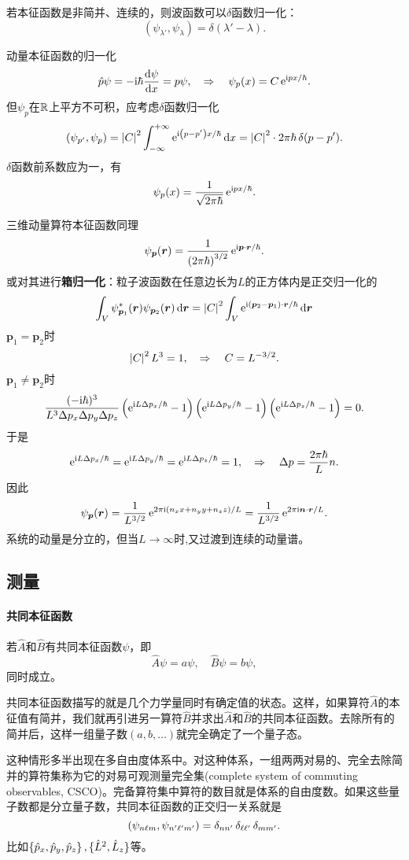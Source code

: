 若本征函数是非简并、连续的，则波函数可以$\delta$函数归一化：%
\[
	(\psi_{\lambda'},\psi_\lambda)=\delta(\lambda'-\lambda).
\]
\begin{example}{动量本征函数的归一化}{}
	\[
		\hat p\psi=-\mathrm{i}\hbar\frac{\mathrm{d}^{\;\!\!}\psi}{\mathrm{d} x^{\;\!\!}}=p\psi,\quad\Rightarrow\quad\psi_p(x)=C\mathop{}\!\mathrm{e}^{\mathrm{i} px/\hbar}.
	\]
	但$\psi_p$在$\mathbb R$上平方不可积，应考虑$\delta$函数归一化
	\[
		(\psi_{p'},\psi_p)=\left\lvert C\right\rvert^2\int_{-\infty}^{+\infty}\mathop{}\!\mathrm{e}^{\mathrm{i}\left(p-p'\right)x/\hbar}\mathop{}\!\mathrm{d} x=\left\lvert C\right\rvert^2\cdot 2\pi\hbar\mathop{}\!\delta(p-p').
	\]
	$\delta$函数前系数应为一，有
	\[
		\psi_p(x)=\frac1{\sqrt{2\pi\hbar}}\mathop{}\!\mathrm{e}^{\mathrm{i} px/\hbar}.
	\]
	
	三维动量算符本征函数同理
	\[
		\psi_{\bm p}(\bm r)=\frac1{\left(2\pi\hbar\right)^{3/2}}\mathop{}\!\mathrm{e}^{\mathrm{i}\bm p\cdot\bm r/\hbar}.
	\]
	\tcblower
	或对其进行\textbf{箱归一化}：粒子波函数在任意边长为$L$的正方体内是正交归一化的
	\[
		\int_V\psi_{\bm p_1}^\ast(\bm r)\psi_{\bm p_2}(\bm r)\mathop{}\!\mathrm{d}\bm r=\left\lvert C\right\rvert^2\int_V\mathop{}\!\mathrm{e}^{\mathrm{i}(\bm p_2-\bm p_1)\cdot\bm r/\hbar}\mathop{}\!\mathrm{d}\bm r
	\]
	$\bm p_1=\bm p_2$时
	\[
		\left\lvert C\right\rvert^2L^3=1,\quad\Rightarrow\quad C=L^{-3/2}.
	\]
	$\bm p_1\neq\bm p_2$时
	\[
		\frac{(-\mathrm{i}\hbar)^3}{L^3\Delta p_x\Delta p_y\Delta p_z}\left(\mathop{}\!\mathrm{e}^{\mathrm{i} L\Delta p_x/\hbar}-1\right)\left(\mathop{}\!\mathrm{e}^{\mathrm{i} L\Delta p_y/\hbar}-1\right)\left(\mathop{}\!\mathrm{e}^{\mathrm{i} L\Delta p_z/\hbar}-1\right)=0.
	\]
	于是
	\[
		\mathop{}\!\mathrm{e}^{\mathrm{i} L\Delta p_x/\hbar}=\mathop{}\!\mathrm{e}^{\mathrm{i} L\Delta p_y/\hbar}=\mathop{}\!\mathrm{e}^{\mathrm{i} L\Delta p_z/\hbar}=1,\quad\Rightarrow\quad\Delta p=\frac{2\pi\hbar}Ln.
	\]
	因此
	\[
		\psi_{\bm p}(\bm r)=\frac1{L^{3/2}}\mathop{}\!\mathrm{e}^{2\pi\mathrm{i}(n_xx+n_yy+n_zz)/L}=\frac1{L^{3/2}}\mathop{}\!\mathrm{e}^{2\pi\mathrm{i}\bm n\cdot\bm r/L}.
	\]
	系统的动量是分立的，但当$L\to\infty$时,又过渡到连续的动量谱。
\end{example}
\subsection{测量}
\paragraph*{共同本征函数}
若$\hat A$和$\hat B$有共同本征函数$\psi$，即
\[
	\hat A\psi=a\psi,\quad\hat B\psi=b\psi,
\]
同时成立。

共同本征函数描写的就是几个力学量同时有确定值的状态。这样，如果算符$\hat A$的本征值有简并，我们就再引进另一算符$\hat B$并求出$\hat A$和$\hat B$的共同本征函数。去除所有的简并后，这样一组量子数$(a,b,\ldots)$就完全确定了一个量子态。

这种情形多半出现在多自由度体系中。对这种体系，一组两两对易的、完全去除简并的算符集称为它的对易可观测量完全集(complete system of commuting observables, CSCO)。完备算符集中算符的数目就是体系的自由度数。如果这些量子数都是分立量子数，共同本征函数的正交归一关系就是
\[
	\left(\psi_{n\ell m},\psi_{n'\ell'm'}\right)=\mathop{}\!\delta_{nn'}\mathop{}\!\delta_{\ell\ell'}\mathop{}\!\delta_{mm'}.
\]
比如$\left\{\hat p_x,\hat p_y,\hat p_z\right\},\{\hat L^2,\hat L_z\}$等。

